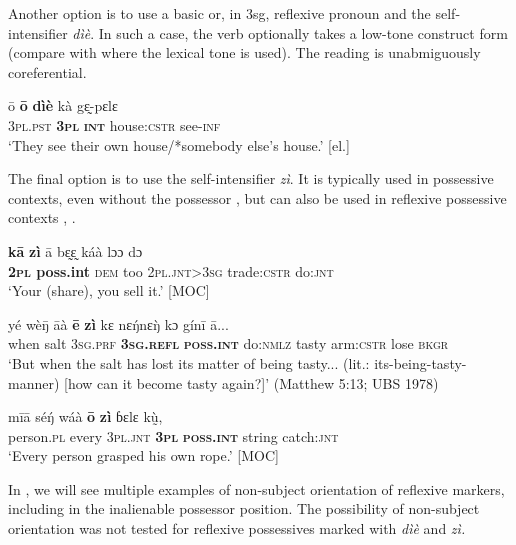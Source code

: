 \documentclass[output=paper]{langscibook}
\begin{document}
Another option is to use a basic or, in 3sg, reflexive pronoun and the self-intensifier \textit{dìè}. In such a case, the verb optionally takes a low-tone construct form (compare with  where the lexical tone is used). The reading is unabmiguously coreferential.

\ea
    \label{ex:Kachaturyan:24} 
 \gll ō  \textbf{ō}  \textbf{dìè}  kà  gɛ̰-pɛlɛ\\
     3\textsc{pl.pst}  \textbf{\textsc{3pl}}  \textbf{\textsc{int}}  house:\textsc{cstr}  see\textsc{{}-inf}\\
\glt ‘They see their own house/*somebody else’s house.’ [el.]\z

The final option is to use the self-intensifier \textit{zì}. It is typically used in possessive contexts, even without the possessor , but can also be used in reflexive possessive contexts , .

\ea
    \label{ex:Kachaturyan:25} 
 \gll \textbf{kā}  \textbf{zì}  ā  bɛ̰ɛ̰  káà  lɔɔ  dɔ\\
     \textbf{\textsc{2pl}  \textbf{poss.int}}  \textsc{dem}  too  \textsc{2pl.jnt>3sg}  trade\textsc{:cstr}  do\textsc{:jnt}\\
\glt ‘Your (share), you sell it.’ [MOC]\\
     \z

\ea
    \label{ex:Kachaturyan:26} 
 \gll yé  wè\={ŋ}  āà  \textbf{ē}  \textbf{zì}  kɛ  nɛ\'{ŋ}nɛ\`{ŋ}  kɔ  gínī  ā...\\
     when  salt  3\textsc{sg.prf}  \textbf{3\textsc{sg.refl}}  \textbf{\textsc{poss.int}}  do:\textsc{nmlz}  tasty  arm:\textsc{cstr}  lose  \textsc{bkgr}\\
\glt ‘But when the salt has lost its matter of being tasty... (lit.: its-being-tasty-manner) [how can it become tasty again?]’ (Matthew 5:13; UBS 1978)\z

\ea
    \label{ex:Kachaturyan:27} 
 \gll mīā  sé\'{ŋ}  wáà  \textbf{ō}  \textbf{zì}  ɓɛlɛ  kṵ̀,\\
     person.\textsc{pl}  every  \textsc{3pl.jnt}  \textbf{\textsc{3pl}}  \textbf{\textsc{poss.int}}  string  catch:\textsc{jnt}\\
\glt ‘Every person grasped his own rope.’ [MOC]\z

In , we will see multiple examples of non-subject orientation of reflexive markers, including in the inalienable possessor position. The possibility of non-subject orientation was not tested for reflexive possessives marked with \textit{dìè} and \textit{zì.}
\end{document}
